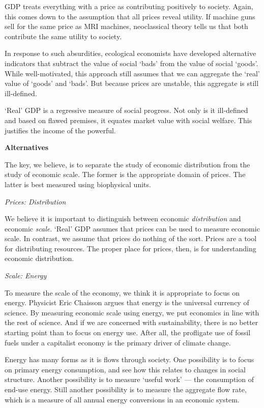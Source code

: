 \documentclass[
]{book}
\begin{document}
GDP treats everything with a price as contributing positively to society. Again, this comes down to the assumption that all prices reveal utility. If machine guns sell for the same price as MRI machines, neoclassical theory tells us that both contribute the same utility to society.

In response to such absurdities, ecological economists have developed alternative indicators that subtract the value of social `bads' from the value of social `goods'. While well-motivated, this approach still assumes that we can aggregate the `real' value of `goods' and `bads'. But because prices are unstable, this aggregate is still ill-defined.

`Real' GDP is a regressive measure of social progress. Not only is it ill-defined and based on flawed premises, it equates market value with social welfare. This justifies the income of the powerful.

\textbf{Alternatives}

The key, we believe, is to separate the study of economic distribution from the study of economic scale. The former is the appropriate domain of prices. The latter is best measured using biophysical units.

\emph{Prices: Distribution}

We believe it is important to distinguish between economic \emph{distribution} and economic \emph{scale}.
`Real' GDP assumes that prices can be used to measure economic scale.
In contrast, we assume that prices do nothing of the sort.
Prices are a tool for distributing resources.
The proper place for prices, then, is for understanding economic distribution.

\emph{Scale: Energy}

To measure the scale of the economy, we think it is appropriate to focus on energy. Physicist Eric Chaisson argues that energy is the universal currency of science. By measuring economic scale using energy, we put economics in line with the rest of science. And if we are concerned with sustainability, there is no better starting point than to focus on energy use. After all, the profligate use of fossil fuels under a capitalist economy is the primary driver of climate change.

Energy has many forms as it is flows through society. One possibility is to focus on primary energy consumption, and see how this relates to changes in social structure. Another possibility is to measure `useful work' --- the consumption of end-use energy. Still another possibility is to measure the aggregate flow rate, which is a measure of all annual energy conversions in an economic system.
\end{document}
